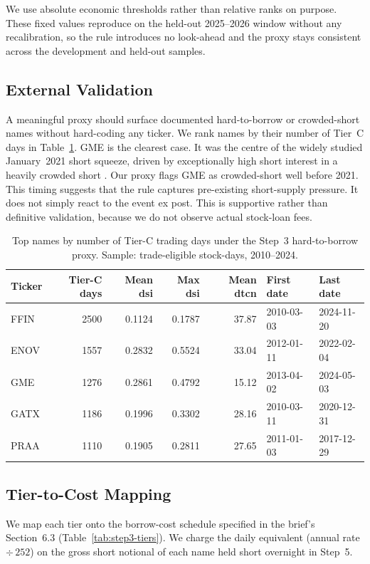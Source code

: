 \documentclass[12pt]{article}
\begin{document}
We use absolute economic thresholds rather than relative ranks on purpose. These
fixed values reproduce on the held-out 2025--2026 window without any recalibration, so the rule introduces no look-ahead and the proxy stays consistent across the development and held-out samples.


\subsection{External Validation}

A meaningful proxy should surface documented hard-to-borrow or crowded-short names without hard-coding any ticker. We rank names by their number of Tier~C
days in Table~\ref{tab:step3-top-tierc}. GME is the clearest case. It was the centre of the widely studied January~2021 short squeeze, driven by exceptionally
high short interest in a heavily crowded short \cite{malz2021gamestop}. Our proxy flags GME
as crowded-short well before 2021. This timing suggests that the rule captures
pre-existing short-supply pressure. It does not simply react to the event ex post. This is supportive rather than definitive validation, because we do not observe actual stock-loan fees.
\begin{table}[H]
\centering
\caption{Top names by number of Tier-C trading days under the Step~3
hard-to-borrow proxy. Sample: trade-eligible stock-days, 2010--2024.}
\label{tab:step3-top-tierc}
\begin{tabular}{lrrrrll}
\toprule
Ticker & Tier-C days & Mean dsi & Max dsi & Mean dtcn & First date & Last date \\
\midrule
FFIN & 2500 & 0.1124 & 0.1787 & 37.87 & 2010-03-03 & 2024-11-20 \\
ENOV & 1557 & 0.2832 & 0.5524 & 33.04 & 2012-01-11 & 2022-02-04 \\
GME  & 1276 & 0.2861 & 0.4792 & 15.12 & 2013-04-02 & 2024-05-03 \\
GATX & 1186 & 0.1996 & 0.3302 & 28.16 & 2010-03-11 & 2020-12-31 \\
PRAA & 1110 & 0.1905 & 0.2811 & 27.65 & 2011-01-03 & 2017-12-29 \\
\bottomrule
\end{tabular}
\end{table}

\subsection{Tier-to-Cost Mapping}
We map each tier onto the borrow-cost schedule specified in the brief's Section~6.3 (Table~\ref{tab:step3-tiers}). We charge the daily equivalent (annual rate $\div\,252$) on the gross short notional of each name held short
overnight in Step~5.
\end{document}
